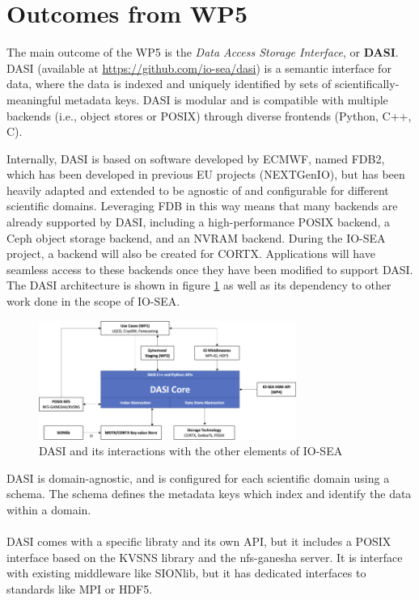 \section{Outcomes from WP5}

The main outcome of the WP5 is the \textit{Data Access Storage Interface}, or \textbf{DASI}. 
DASI (available at \url{https://github.com/io-sea/dasi}) is a semantic interface for data, where the data is
indexed and uniquely identified by sets of scientifically-meaningful metadata keys. DASI is modular and is
compatible with multiple backends (i.e., object stores or POSIX) through diverse frontends (Python, C++, C).

Internally, DASI is based on software developed by ECMWF, named FDB2, which has been developed in previous EU
projects (NEXTGenIO), but has been heavily adapted and extended to be agnostic of and configurable for
different scientific domains. Leveraging FDB in this way means that many backends are already supported by DASI,
including a high-performance POSIX backend, a Ceph object storage backend, and an NVRAM backend. During the
IO-SEA project, a backend will also be created for CORTX. Applications will have seamless access to these
backends once they have been modified to support DASI. The DASI architecture is shown in figure \ref{fig:dasi}
as well as its dependency to other work done in the scope of IO-SEA.

\begin{figure}[H]
    \centering
    \includegraphics[width=0.75\textwidth]{FIGS/dasi.png}
    \caption[Migration Path]{ DASI and its interactions with the other elements of IO-SEA}
    \label{fig:dasi}
\end{figure}

DASI is domain-agnostic, and is configured for each scientific domain using a schema. The schema
defines the metadata keys which index and identify the data within a domain. 

\paragraph{}
DASI comes with a specific libraty and its own API, but it includes a POSIX interface based on the KVSNS
library and the nfs-ganesha server. It is interface with existing middleware like SIONlib, but it has 
dedicated interfaces to standards like MPI or HDF5. 

